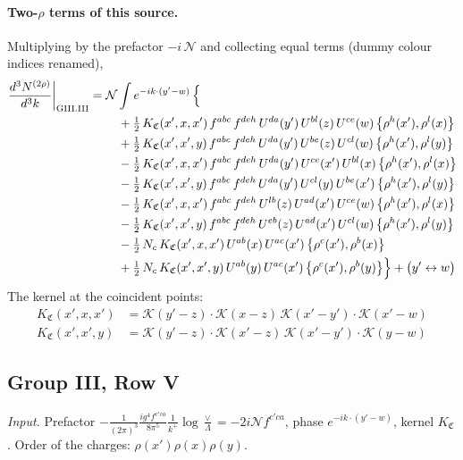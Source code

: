 \documentclass[10pt]{article}
\numberwithin{equation}{section}
\newcommand{\KK}{\mathcal K}
\newcommand{\NN}{\mathcal N}
\begin{document}
\paragraph{Two-$\rho$ terms of this source.} Multiplying by the prefactor $-i\,\NN$ and collecting equal terms (dummy colour indices renamed),
\begin{align}
\frac{d^3N^{(2\rho)}}{d^3k}\bigg|_{\rm GIII.III}={}&\NN\int e^{-ik\cdot(y'-w)}\,\Big\{\notag\\
&\quad +\tfrac12\,K_{\mathfrak C}(x',x,x')\,f^{abc}\,f^{deh}\,U^{da}(y')\,U^{bl}(z)\,U^{ce}(w)\,\big\{\rho^{h}(x'),\rho^{l}(x)\big\}\notag\\
&\quad +\tfrac12\,K_{\mathfrak C}(x',x',y)\,f^{abc}\,f^{deh}\,U^{da}(y')\,U^{be}(z)\,U^{cl}(w)\,\big\{\rho^{h}(x'),\rho^{l}(y)\big\}\notag\\
&\quad -\tfrac12\,K_{\mathfrak C}(x',x,x')\,f^{abc}\,f^{deh}\,U^{da}(y')\,U^{ce}(x')\,U^{bl}(x)\,\big\{\rho^{h}(x'),\rho^{l}(x)\big\}\notag\\
&\quad -\tfrac12\,K_{\mathfrak C}(x',x',y)\,f^{abc}\,f^{deh}\,U^{da}(y')\,U^{cl}(y)\,U^{be}(x')\,\big\{\rho^{h}(x'),\rho^{l}(y)\big\}\notag\\
&\quad -\tfrac12\,K_{\mathfrak C}(x',x,x')\,f^{abc}\,f^{deh}\,U^{lb}(z)\,U^{ad}(x')\,U^{ce}(w)\,\big\{\rho^{h}(x'),\rho^{l}(x)\big\}\notag\\
&\quad -\tfrac12\,K_{\mathfrak C}(x',x',y)\,f^{abc}\,f^{deh}\,U^{eb}(z)\,U^{ad}(x')\,U^{cl}(w)\,\big\{\rho^{h}(x'),\rho^{l}(y)\big\}\notag\\
&\quad -\tfrac12\,N_{c}\,K_{\mathfrak C}(x',x,x')\,U^{ab}(x)\,U^{ac}(x')\,\big\{\rho^{c}(x'),\rho^{b}(x)\big\}\notag\\
&\quad +\tfrac12\,N_{c}\,K_{\mathfrak C}(x',x',y)\,U^{ab}(y)\,U^{ac}(x')\,\big\{\rho^{c}(x'),\rho^{b}(y)\big\}\Big\}+\big(y'\leftrightarrow w\big)\label{eq:res-GIII.III}
\end{align}
The kernel at the coincident points:
\begin{align*}
K_{\mathfrak C}(x',x,x')&=\KK(y'-z)\cdot\KK(x-z)\,\KK(x'-y')\cdot\KK(x'-w)\\K_{\mathfrak C}(x',x',y)&=\KK(y'-z)\cdot\KK(x'-z)\,\KK(x'-y')\cdot\KK(y-w)
\end{align*}
\subsection{Group III, Row V}\label{sec:GIII.V}
\emph{Input.} Prefactor $-\frac{1}{(2\pi)^3}\frac{ig^4f^{c'ca}}{8\pi^5}\frac1{k^+}\log\frac\vee\Lambda=-2i\NN f^{c'ca}$, phase $e^{-ik\cdot(y'-w)}$, kernel $K_{\mathfrak C}$. Order of the charges: $\rho(x')\rho(x)\rho(y)$.
\end{document}
